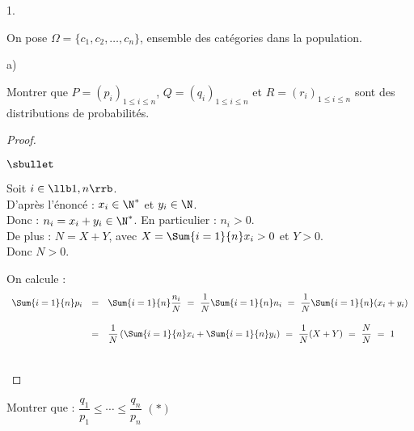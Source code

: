 \documentclass[11pt]{article}%
\begin{document}
\begin{noliste}{1.}
 \setlength{\itemsep}{4mm}
 \setcounter{enumi}{9}
 \item On pose $\Omega=\{c_1,c_2, \ldots ,c_n\}$, ensemble des 
 catégories dans la population.
 \begin{noliste}{a)}
  \setlength{\itemsep}{2mm}
  \item Montrer que $P=(p_i)_{1 \leq i \leq n}$, $Q= (q_i)_{1 \leq i 
  \leq n}$ et $R= (r_i)_{1 \leq i \leq n}$ sont des distributions de 
  probabilités.
  
  \begin{proof}~
    \begin{noliste}{$\sbullet$}
      \item Soit $i\in \llb 1,n \rrb$.\\
      D'après l'énoncé : $x_i
      \in \N^*$ et $y_i \in \N$.\\
      Donc : $n_i =x_i+y_i \in \N^*$. En particulier : $n_i > 0$.\\
      De plus : $N=X+Y$, avec $X= \Sum{i=1}{n} x_i > 0$ et $Y>0$.\\
      Donc $N>0$.
      
      \item On calcule :
      \[
      \begin{array}{rcl}
        \Sum{i=1}{n} p_i & = & \Sum{i=1}{n} \dfrac{n_i}{N} \ = \ 
        \dfrac{1}{N} \Sum{i=1}{n} n_i \ = \ \dfrac{1}{N} \Sum{i=1}{n}
        (x_i+y_i) 
        \\[.6cm]
        & = & \dfrac{1}{N} \left(\Sum{i=1}{n} x_i + 
	\Sum{i=1}{n} y_i \right) \ = \
        \dfrac{1}{N}(X+Y) \ = \ \dfrac{N}{N} \ = \ 1
      \end{array}
      \]
    \end{noliste}
    ~\\[-1cm]
  \end{proof}
  
  
  

  
  \item Montrer que : $\dfrac{q_1}{p_1} \leq \cdots \leq 
  \dfrac{q_n}{p_n}$ $(\ast)$
  

\end{noliste}
\end{noliste}
\end{document}
